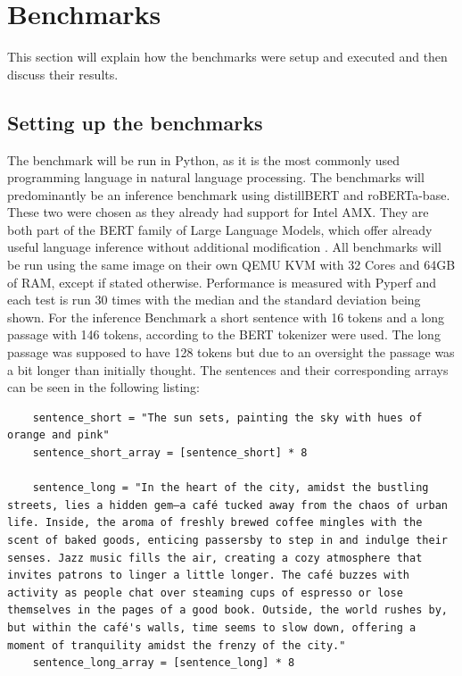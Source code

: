 \section{Benchmarks}

This section will explain how the benchmarks were setup and executed and then discuss their results.

\subsection{Setting up the benchmarks}
\label{sec:SecondContent:SecondSection}

The benchmark will be run in Python, as it is the most commonly used programming language in natural language processing. The benchmarks will predominantly be an inference benchmark using distillBERT and roBERTa-base. These two were chosen as they already had support for Intel AMX. They are both part of the BERT family of Large Language Models, which offer already useful language inference without additional modification \cite{devlin_bert_2019}. All benchmarks will be run using the same image on their own QEMU KVM with 32 Cores and 64GB of RAM, except if stated otherwise. Performance is measured with Pyperf and each test is run 30 times with the median and the standard deviation being shown.
For the inference Benchmark a short sentence with 16 tokens and a long passage with 146 tokens, according to the BERT tokenizer were used. The long passage was supposed to have 128 tokens but due to an oversight the passage was a bit longer than initially thought. The sentences and their corresponding arrays can be seen in the following listing:
    \begin{verbatim}
    sentence_short = "The sun sets, painting the sky with hues of orange and pink"
    sentence_short_array = [sentence_short] * 8
    
    sentence_long = "In the heart of the city, amidst the bustling streets, lies a hidden gem—a café tucked away from the chaos of urban life. Inside, the aroma of freshly brewed coffee mingles with the scent of baked goods, enticing passersby to step in and indulge their senses. Jazz music fills the air, creating a cozy atmosphere that invites patrons to linger a little longer. The café buzzes with activity as people chat over steaming cups of espresso or lose themselves in the pages of a good book. Outside, the world rushes by, but within the café's walls, time seems to slow down, offering a moment of tranquility amidst the frenzy of the city."
    sentence_long_array = [sentence_long] * 8
    \end{verbatim}

